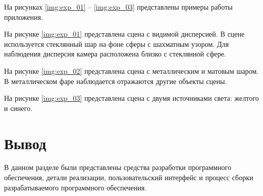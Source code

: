         На рисунках \ref{img:exp_01} -- \ref{img:exp_03} представлены примеры работы приложения.
        
        На рисунке \ref{img:exp_01} представлена сцена с видимой дисперсией. В сцене используется стеклянный шар на фоне сферы с шахматным узором. Для наблюдения дисперсия камера расположена близко с стеклянной сфере.
        
        
        На рисунке \ref{img:exp_02} представлена сцена с металлическим и матовым шаром. В металлическом фаре наблюдается отражаются другие объекты сцены.
        
        
        На рисунке \ref{img:exp_03} представлена сцена с двумя источниками света: желтого и синего.
        
    
    \clearpage
    
    \section{Вывод}

        В данном разделе были представлены средства разработки программного обеспечения, детали реализации, пользовательский интерфейс и процесс сборки разрабатываемого программного обеспечения.